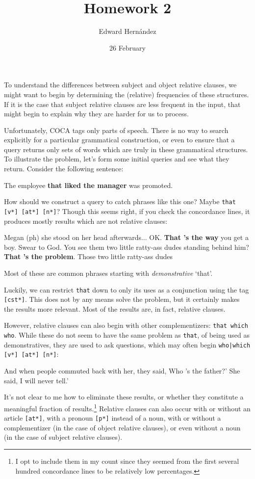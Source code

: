 \documentclass[doc,12pt]{apa6}
\begin{document}
\title{Homework 2}
\author{Edward Hern\'{a}ndez}
\date{26 February}
\maketitle

To understand the differences between subject and object relative clauses, we
might want to begin by determining the (relative) frequencies of these
structures. If it is the case that subject relative clauses are less frequent
in the input, that might begin to explain why they are harder for us to
process.

Unfortunately, COCA tags only parts of speech. There is no way to search
explicitly for a particular grammatical construction, or even to ensure that a
query returns only sets of words which are truly in these grammatical
structures. 
To illustrate the problem, let's form some initial queries and see what they
return. Consider the following sentence:
\begin{exe}
	\ex The employee \textbf{that liked the manager} was promoted.
\end{exe}
How should we construct a query to catch phrases like this one? Maybe
\texttt{that {[}v*{]} {[}at*{]} {[}n*{]}}? Though this seems right, if you
check the concordance lines, it produces mostly results which are not relative
clauses:
\begin{exe}
	\ex Megan (ph) she stood on her head afterwards... OK. \textbf{That 's the way} you get a boy. Swear to God.
	\ex You see them two little ratty-ass dudes standing behind him? \textbf{That 's the problem}. Those two little ratty-ass dudes
\end{exe}
Most of these are common phrases starting with \emph{demonstrative} `that'.

Luckily, we can restrict \texttt{that} down to only its uses as a conjunction
using the tag \texttt{{[}cst*{]}}. This does not by any means solve the
problem, but it certainly makes the results more relevant. Most of the results
are, in fact, relative clauses.

However, relative clauses can also begin with other complementizers:
\texttt{that which who}. While these do not seem to have the same problem as
\texttt{that}, of being used as demonstratives, they are used to ask questions,
which may often begin \texttt{who|which {[}v*{]} {[}at*{]} {[}n*{]}}:
\begin{exe}
	\ex And when people commuted back with her, they said, Who 's the father?' She said, I will never tell.'
\end{exe}
It's not clear to me how to eliminate these results, or whether they constitute
a meaningful fraction of results.\footnote{I opt to include them in my count
since they seemed from the first several hundred concordance lines to be
relatively low percentages.} Relative clauses can also occur with or without an
article \texttt{{[}at*{]}}, with a pronoun \texttt{{[}p*{]}} instead of a noun,
with or without a complementizer (in the case of object relative clauses), or
even without a noun (in the case of subject relative clauses).
\end{document}
